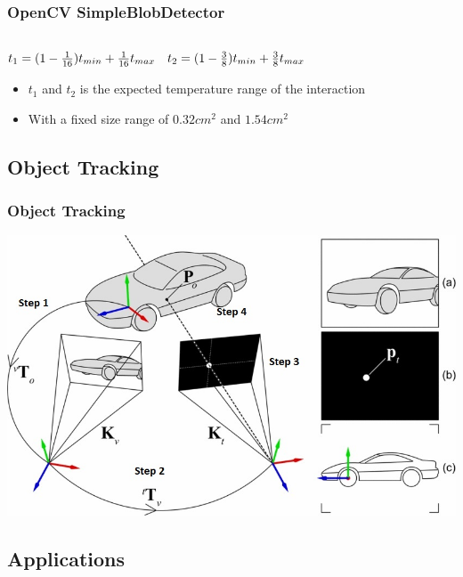 \documentclass{beamer}
\begin{document}
\begin{frame}
\frametitle{OpenCV SimpleBlobDetector}
	\(
\begin{matrix} \\
 t_{1}=(1-{1\over 16})t_{ min}+{1\over 16}t_{ max} & t_{2}=(1-{3\over 8})t_{ min}+{3\over 8}t_{ max}\cr 
 \end{matrix} 
\)

	\begin{itemize}
		\item \(t_{1}\) and \(t_{2}\) is the expected temperature range of the interaction
		\item With a fixed size range of \(0.32cm^2\) and \(1.54cm^2\)
	\end{itemize}
\end{frame}

\subsection{Object Tracking}
\begin{frame}	
\frametitle{Object Tracking}
	\includegraphics[width=\textwidth]{images/Tracking}

\end{frame}



\subsection{Applications}
\end{document}
